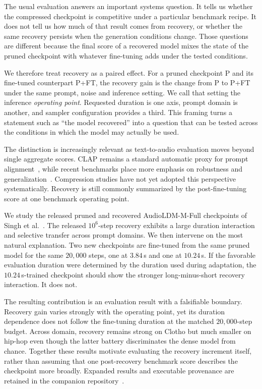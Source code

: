\documentclass{article}
\newcommand{\PFT}{P{+}FT}
\begin{document}
The usual evaluation answers an important systems question. It tells us whether the compressed checkpoint is competitive under a particular benchmark recipe. It does not tell us how much of that result comes from recovery, or whether the same recovery persists when the generation conditions change. Those questions are different because the final score of a recovered model mixes the state of the pruned checkpoint with whatever fine-tuning adds under the tested conditions.

We therefore treat recovery as a paired effect. For a pruned checkpoint P and its fine-tuned counterpart \PFT{}, the recovery gain is the change from P to \PFT{} under the same prompt, noise and inference setting. We call that setting the inference \emph{operating point}. Requested duration is one axis, prompt domain is another, and sampler configuration provides a third. This framing turns a statement such as ``the model recovered'' into a question that can be tested across the conditions in which the model may actually be used.

The distinction is increasingly relevant as text-to-audio evaluation moves beyond single aggregate scores. CLAP remains a standard automatic proxy for prompt alignment~\cite{wu2023clap,huang2023makeanaudio,ghosal2023tango}, while recent benchmarks place more emphasis on robustness and generalization~\cite{wang2026ttabench}. Compression studies have not yet adopted this perspective systematically. Recovery is still commonly summarized by the post-fine-tuning score at one benchmark operating point.

We study the released pruned and recovered AudioLDM-M-Full checkpoints of Singh et al.~\cite{singh2026pruning}. The released $10^{6}$-step recovery exhibits a large duration interaction and selective transfer across prompt domains. We then intervene on the most natural explanation. Two new checkpoints are fine-tuned from the same pruned model for the same $20{,}000$ steps, one at $3.84$\,s and one at $10.24$\,s. If the favorable evaluation duration were determined by the duration used during adaptation, the $10.24$\,s-trained checkpoint should show the stronger long-minus-short recovery interaction. It does not.

The resulting contribution is an evaluation result with a falsifiable boundary. Recovery gain varies strongly with the operating point, yet its duration dependence does not follow the fine-tuning duration at the matched $20{,}000$-step budget. Across domain, recovery remains strong on Clotho but much smaller on hip-hop even though the latter battery discriminates the dense model from chance. Together these results motivate evaluating the recovery increment itself, rather than assuming that one post-recovery benchmark score describes the checkpoint more broadly. Expanded results and executable provenance are retained in the companion repository~\cite{bibbo2026repo}.
\end{document}
